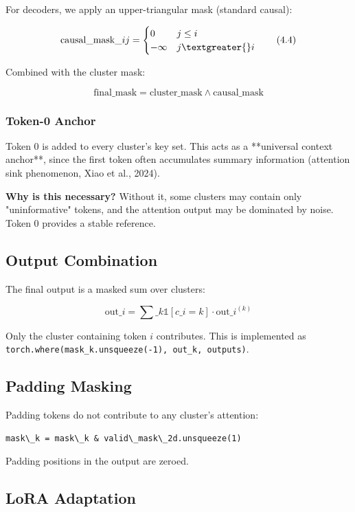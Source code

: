 For decoders, we apply an upper-triangular mask (standard causal):

\[
\text{causal\_mask}\_{ij} = \begin{cases} 0 & j \leq i \\ -\infty & j \textgreater{} i \end{cases}
\tag{4.4}
\]

Combined with the cluster mask:

\[
\text{final\_mask} = \text{cluster\_mask} \wedge \text{causal\_mask}
\tag{4.5}
\]

\subsubsection{Token-0 Anchor}

Token 0 is added to every cluster's key set. This acts as a **universal 
context anchor**, since the first token often accumulates summary 
information (attention sink phenomenon, Xiao et al., 2024).

\textbf{Why is this necessary?} Without it, some clusters may contain only 
"uninformative" tokens, and the attention output may be dominated by 
noise. Token 0 provides a stable reference.

\subsection{Output Combination}

The final output is a masked sum over clusters:

\[
\text{out}\_i = \sum\_k \mathbb{1}[c\_i = k] \cdot \text{out}\_i^{(k)}
\tag{4.6}
\]

Only the cluster containing token $i$ contributes. This is implemented as 
\texttt{torch.where(mask\_k.unsqueeze(-1), out\_k, outputs)}.

\subsection{Padding Masking}

Padding tokens do not contribute to any cluster's attention:

\begin{lstlisting}
mask\_k = mask\_k & valid\_mask\_2d.unsqueeze(1)
\end{lstlisting}

Padding positions in the output are zeroed.

\subsection{LoRA Adaptation}

